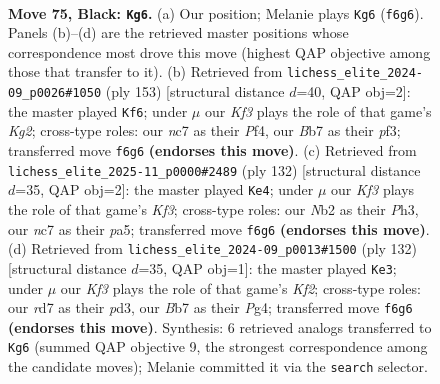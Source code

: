 \documentclass[11pt]{article}
\begin{document}
\clearpage

\begin{figure}[p]\centering
\begin{subfigure}{0.46\textwidth}\centering
\resizebox{\linewidth}{!}{%
\newchessgame
\chessboard[
  setfen={8/PbNR4/5k2/8/1p3PB1/6P1/1n2K2P/8 b - - 19 75},
  showmover=false,
  pgfstyle=straightmove, color=movearrow, markmove={f6-g6}
]}
\caption{}
\end{subfigure}\hfill
\begin{subfigure}{0.46\textwidth}\centering
\resizebox{\linewidth}{!}{%
\newchessgame
\chessboard[
  setfen={8/6k1/4B3/p7/5p2/5P1K/P4bP1/8 b - - 41 77},
  showmover=false,
  pgfstyle=straightmove, color=movearrow, markmove={g7-f6}
]}
\caption{}
\end{subfigure}
\\[4pt]
\begin{subfigure}{0.46\textwidth}\centering
\resizebox{\linewidth}{!}{%
\newchessgame
\chessboard[
  setfen={8/2b4p/4p1p1/p5k1/B2p4/5K1P/8/8 w - - 3 67},
  showmover=false,
  pgfstyle=straightmove, color=movearrow, markmove={f3-e4}
]}
\caption{}
\end{subfigure}\hfill
\begin{subfigure}{0.46\textwidth}\centering
\resizebox{\linewidth}{!}{%
\newchessgame
\chessboard[
  setfen={8/7p/7P/N2k2p1/1p2p1P1/2bp4/5K2/8 w - - 0 67},
  showmover=false,
  pgfstyle=straightmove, color=movearrow, markmove={f2-e3}
]}
\caption{}
\end{subfigure}
\caption{\textbf{Move 75, Black: \texttt{Kg6}.} (a) Our position; Melanie plays \texttt{Kg6} (\texttt{f6g6}). Panels (b)--(d) are the retrieved master positions whose correspondence most drove this move (highest QAP objective among those that transfer to it). (b) Retrieved from \texttt{lichess\_elite\_2024-09\_p0026\#1050} (ply 153) [structural distance $d$=40, QAP obj=2]: the master played \texttt{Kf6}; under $\mu$ our \emph{Kf3} plays the role of that game's \emph{Kg2}; cross-type roles: our \emph{n}c7 as their \emph{P}f4, our \emph{B}b7 as their \emph{p}f3; transferred move \texttt{f6g6} \textbf{(endorses this move)}. (c) Retrieved from \texttt{lichess\_elite\_2025-11\_p0000\#2489} (ply 132) [structural distance $d$=35, QAP obj=2]: the master played \texttt{Ke4}; under $\mu$ our \emph{Kf3} plays the role of that game's \emph{Kf3}; cross-type roles: our \emph{N}b2 as their \emph{P}h3, our \emph{n}c7 as their \emph{p}a5; transferred move \texttt{f6g6} \textbf{(endorses this move)}. (d) Retrieved from \texttt{lichess\_elite\_2024-09\_p0013\#1500} (ply 132) [structural distance $d$=35, QAP obj=1]: the master played \texttt{Ke3}; under $\mu$ our \emph{Kf3} plays the role of that game's \emph{Kf2}; cross-type roles: our \emph{r}d7 as their \emph{p}d3, our \emph{B}b7 as their \emph{P}g4; transferred move \texttt{f6g6} \textbf{(endorses this move)}. Synthesis: 6 retrieved analogs transferred to \texttt{Kg6} (summed QAP objective 9, the strongest correspondence among the candidate moves); Melanie committed it via the \texttt{search} selector.}
\label{fig:thought-m149}
\end{figure}
\end{document}
